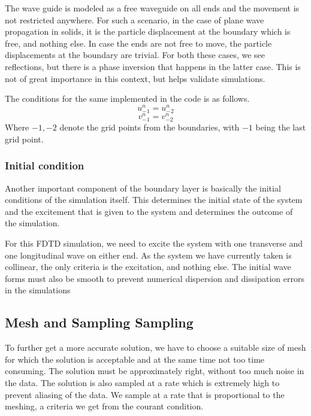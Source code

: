The wave guide is modeled as a free waveguide on all ends and the movement is not restricted anywhere. For such a scenario, in the case of plane wave propagation in solids, it is the particle displacement at the boundary which is free, and nothing else. In case the ends are not free to move, the particle displacements at the boundary are trivial. For both these cases, we see reflections, but there is a phase inversion that happens in the latter case. This is not of great importance in this context, but helps validate simulations.

The conditions for the same implemented in the code is as follows.
\begin{equation}
u^n_{-1} = u^n_{-2}
\end{equation}
\begin{equation}
v^n_{-1} = v^n_{-2}
\end{equation}
Where $-1, -2$ denote the grid points from the boundaries, with $-1$ being the last grid point.
\subsubsection{Initial condition}
Another important component of the boundary layer is basically the initial conditions of the simulation itself. This determines the initial state of the system and the excitement that is given to the system and determines the outcome of the simulation. 

For this FDTD simulation, we need to excite the system with one transverse and one longitudinal wave on either end. As the system we have currently taken is collinear, the only criteria is the excitation, and nothing else. The initial wave forms must also be smooth\cite{smoothness} to prevent numerical dispersion and dissipation errors in the simulations \cite{errors} \cite{errors_2}

\subsection{Mesh and Sampling Sampling}
To further get a more accurate solution, we have to choose a suitable size of mesh for which the solution is acceptable and at the same time not too time consuming. The solution must be approximately right, without too much noise in the data. The solution is also sampled at a rate which is extremely high to prevent aliasing of the data. We sample at a rate that is proportional to the meshing, a criteria we get from the courant condition.

